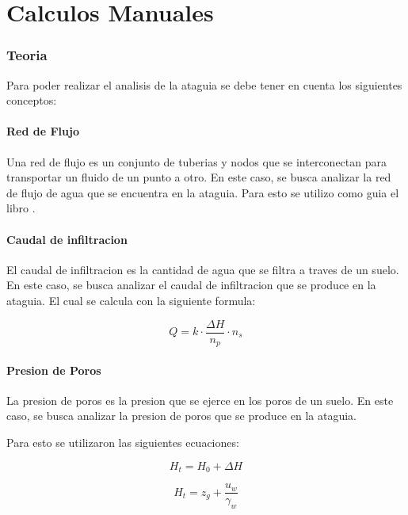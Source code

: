 \part{Calculos Manuales}

\section{Teoria}

Para poder realizar el analisis de la ataguia se debe tener en cuenta los siguientes conceptos:

\subsection{Red de Flujo}

Una red de flujo es un conjunto de tuberias y nodos que se interconectan para transportar un fluido de un punto a otro. En este caso, se busca analizar la red de flujo de agua que se encuentra en la ataguia. Para esto se utilizo como guia el libro \cite{budhu2011}.

\subsection{Caudal de infiltracion}

El caudal de infiltracion es la cantidad de agua que se filtra a traves de un suelo. En este caso, se busca analizar el caudal de infiltracion que se produce en la ataguia.
El cual se calcula con la siguiente formula:

\begin{equation}
    Q = k \cdot \frac{\Delta H}{n_{p}} \cdot n_{s}
\end{equation}

\subsection{Presion de Poros}

La presion de poros es la presion que se ejerce en los poros de un suelo. En este caso, se busca analizar la presion de poros que se produce en la ataguia.

Para esto se utilizaron las siguientes ecuaciones:

\begin{equation}
    H_{t} = H_{0} + \Delta H
\end{equation}

\begin{equation}
    H_{t} = z_{g} + \frac{u_{w}}{\gamma_{w}}
\end{equation}

